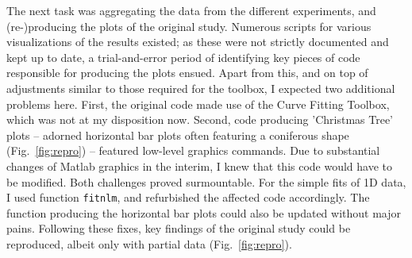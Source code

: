 The next task was aggregating the data from the different experiments, and (re-)producing the plots of the original study. Numerous scripts for various visualizations of the results existed; as these were not strictly documented and kept up to date, a trial-and-error period of identifying key pieces of code responsible for producing the plots ensued. Apart from this, and on top of adjustments similar to those required for the toolbox, I expected two additional problems here. First, the original code made use of the Curve Fitting Toolbox, which was not at my disposition now. Second, code producing 'Christmas Tree' plots -- adorned horizontal bar plots often featuring a coniferous shape (Fig.~\ref{fig:repro}) -- featured low-level graphics commands. Due to substantial changes of Matlab graphics in the interim, I knew that this code would have to be modified.
Both challenges proved surmountable. For the simple fits of 1D data, I used function \texttt{fitnlm}, and refurbished the affected code accordingly. The function producing the horizontal bar plots could also be updated without major pains. Following these fixes, key findings of the original study could be reproduced, albeit only with partial data (Fig.~\ref{fig:repro}).

